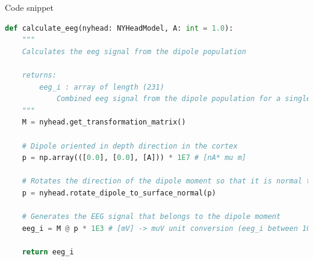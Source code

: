 \documentclass[aspectratio=169]{beamer}
\begin{document}
\begin{frame}[fragile]{Code snippet}
\begin{lstlisting}[language=Python, frame=single, basicstyle=\fontsize{6}{6}\selectfont]
def calculate_eeg(nyhead: NYHeadModel, A: int = 1.0):
    """
    Calculates the eeg signal from the dipole population

    returns:
        eeg_i : array of length (231)
            Combined eeg signal from the dipole population for a single patient
    """
    M = nyhead.get_transformation_matrix()

    # Dipole oriented in depth direction in the cortex
    p = np.array(([0.0], [0.0], [A])) * 1E7 # [nA* mu m]

    # Rotates the direction of the dipole moment so that it is normal to the cerebral cortex
    p = nyhead.rotate_dipole_to_surface_normal(p)

    # Generates the EEG signal that belongs to the dipole moment
    eeg_i = M @ p * 1E3 # [mV] -> muV unit conversion (eeg_i between 10 og 100)

    return eeg_i
\end{lstlisting}
\end{frame}





%
%
%
%
%
%
%
%
\end{document}
